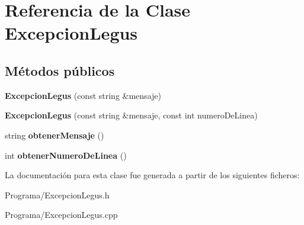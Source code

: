 \hypertarget{class_excepcion_legus}{\section{Referencia de la Clase Excepcion\-Legus}
\label{class_excepcion_legus}
}
\subsection*{Métodos públicos}
\begin{DoxyCompactItemize}
\item 
\hypertarget{class_excepcion_legus_adba881013d63c418e3b5e7de3983d727}{{\bfseries Excepcion\-Legus} (const string \&mensaje)}\label{class_excepcion_legus_adba881013d63c418e3b5e7de3983d727}

\item 
\hypertarget{class_excepcion_legus_aa69a16fe17200a2944c3d1b78a3b8e6e}{{\bfseries Excepcion\-Legus} (const string \&mensaje, const int numero\-De\-Linea)}\label{class_excepcion_legus_aa69a16fe17200a2944c3d1b78a3b8e6e}

\item 
\hypertarget{class_excepcion_legus_ae7f5108035e64b28a4ad41944be04b6a}{string {\bfseries obtener\-Mensaje} ()}\label{class_excepcion_legus_ae7f5108035e64b28a4ad41944be04b6a}

\item 
\hypertarget{class_excepcion_legus_a388b5c30962877f7d5115111d08d1429}{int {\bfseries obtener\-Numero\-De\-Linea} ()}\label{class_excepcion_legus_a388b5c30962877f7d5115111d08d1429}

\end{DoxyCompactItemize}


La documentación para esta clase fue generada a partir de los siguientes ficheros\-:\begin{DoxyCompactItemize}
\item 
Programa/Excepcion\-Legus.\-h\item 
Programa/Excepcion\-Legus.\-cpp\end{DoxyCompactItemize}
